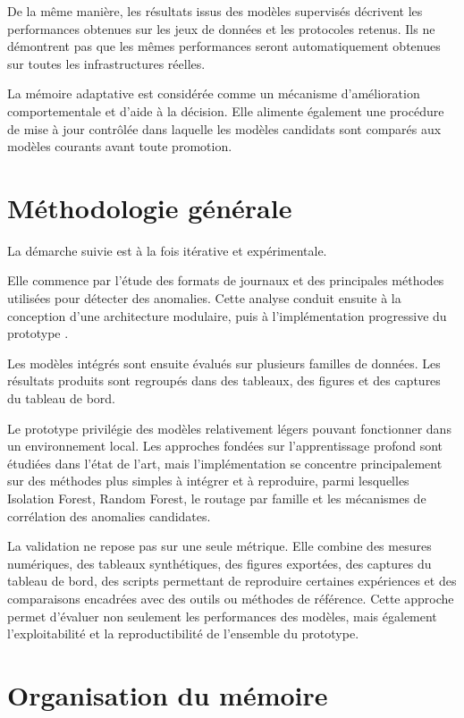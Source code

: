 De la même manière, les résultats issus des modèles supervisés décrivent les performances obtenues sur les jeux de données et les protocoles retenus. Ils ne démontrent pas que les mêmes performances seront automatiquement obtenues sur toutes les infrastructures réelles.

La mémoire adaptative est considérée comme un mécanisme d'amélioration comportementale et d'aide à la décision. Elle alimente également une procédure de mise à jour contrôlée dans laquelle les modèles candidats sont comparés aux modèles courants avant toute promotion.

\section{Méthodologie générale}

La démarche suivie est à la fois itérative et expérimentale.

Elle commence par l'étude des formats de journaux et des principales méthodes utilisées pour détecter des anomalies. Cette analyse conduit ensuite à la conception d'une architecture modulaire, puis à l'implémentation progressive du prototype \logminer{}.

Les modèles intégrés sont ensuite évalués sur plusieurs familles de données. Les résultats produits sont regroupés dans des tableaux, des figures et des captures du tableau de bord.

Le prototype privilégie des modèles relativement légers pouvant fonctionner dans un environnement local. Les approches fondées sur l'apprentissage profond sont étudiées dans l'état de l'art, mais l'implémentation se concentre principalement sur des méthodes plus simples à intégrer et à reproduire, parmi lesquelles Isolation Forest, Random Forest, le routage par famille et les mécanismes de corrélation des anomalies candidates.

La validation ne repose pas sur une seule métrique. Elle combine des mesures numériques, des tableaux synthétiques, des figures exportées, des captures du tableau de bord, des scripts permettant de reproduire certaines expériences et des comparaisons encadrées avec des outils ou méthodes de référence. Cette approche permet d'évaluer non seulement les performances des modèles, mais également l'exploitabilité et la reproductibilité de l'ensemble du prototype.

\section{Organisation du mémoire}

